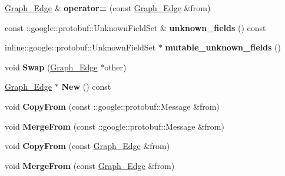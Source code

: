 \begin{DoxyCompactItemize}
\item 
\hypertarget{classgraph_1_1Graph__Edge_a271827f73c4c315e95210cccb000e8f1}{
\hyperlink{classgraph_1_1Graph__Edge}{Graph\_\-Edge} \& {\bfseries operator=} (const \hyperlink{classgraph_1_1Graph__Edge}{Graph\_\-Edge} \&from)}
\label{classgraph_1_1Graph__Edge_a271827f73c4c315e95210cccb000e8f1}

\item 
\hypertarget{classgraph_1_1Graph__Edge_ad3839379afb5e8a8965bbfa48e6ab52c}{
const ::google::protobuf::UnknownFieldSet \& {\bfseries unknown\_\-fields} () const }
\label{classgraph_1_1Graph__Edge_ad3839379afb5e8a8965bbfa48e6ab52c}

\item 
\hypertarget{classgraph_1_1Graph__Edge_ab23e809a21f594cc319a0d1f781fa384}{
inline::google::protobuf::UnknownFieldSet $\ast$ {\bfseries mutable\_\-unknown\_\-fields} ()}
\label{classgraph_1_1Graph__Edge_ab23e809a21f594cc319a0d1f781fa384}

\item 
\hypertarget{classgraph_1_1Graph__Edge_aaaf2710e8754faf829d2966551176aac}{
void {\bfseries Swap} (\hyperlink{classgraph_1_1Graph__Edge}{Graph\_\-Edge} $\ast$other)}
\label{classgraph_1_1Graph__Edge_aaaf2710e8754faf829d2966551176aac}

\item 
\hypertarget{classgraph_1_1Graph__Edge_a0758753878823f19c37d391d965a4fc3}{
\hyperlink{classgraph_1_1Graph__Edge}{Graph\_\-Edge} $\ast$ {\bfseries New} () const }
\label{classgraph_1_1Graph__Edge_a0758753878823f19c37d391d965a4fc3}

\item 
\hypertarget{classgraph_1_1Graph__Edge_ae610eaa471b68f5c8effe5bd28b5cf8c}{
void {\bfseries CopyFrom} (const ::google::protobuf::Message \&from)}
\label{classgraph_1_1Graph__Edge_ae610eaa471b68f5c8effe5bd28b5cf8c}

\item 
\hypertarget{classgraph_1_1Graph__Edge_a21df881962677b6db77cd0fc6fdb8086}{
void {\bfseries MergeFrom} (const ::google::protobuf::Message \&from)}
\label{classgraph_1_1Graph__Edge_a21df881962677b6db77cd0fc6fdb8086}

\item 
\hypertarget{classgraph_1_1Graph__Edge_a70c9bb7cbaad6263cf5b67a61315daaf}{
void {\bfseries CopyFrom} (const \hyperlink{classgraph_1_1Graph__Edge}{Graph\_\-Edge} \&from)}
\label{classgraph_1_1Graph__Edge_a70c9bb7cbaad6263cf5b67a61315daaf}

\item 
\hypertarget{classgraph_1_1Graph__Edge_a9c6886542c53a31f42ae5ea9afa826c2}{
void {\bfseries MergeFrom} (const \hyperlink{classgraph_1_1Graph__Edge}{Graph\_\-Edge} \&from)}
\label{classgraph_1_1Graph__Edge_a9c6886542c53a31f42ae5ea9afa826c2}


\end{DoxyCompactItemize}
